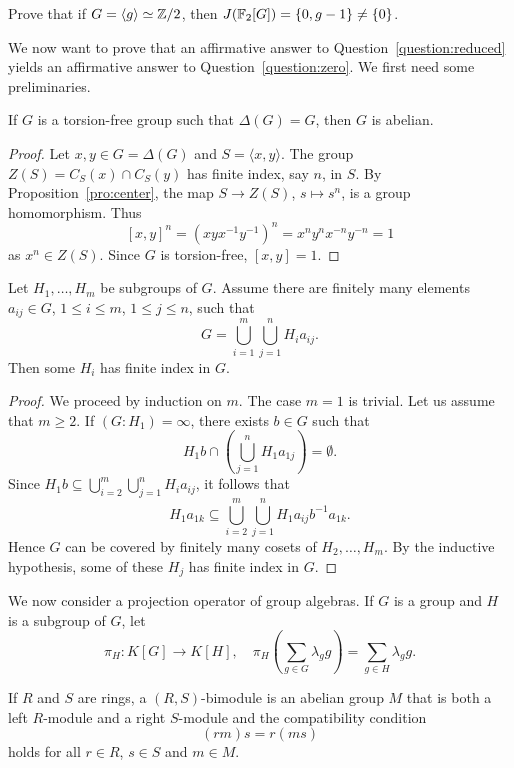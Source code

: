 \begin{exercise}
	Prove that if $G=\langle g\rangle\simeq\mathbb{Z}/2$, then 
	$J(\mathbb{F}_2[G])=\{0,g-1\}\ne\{0\}$. 
\end{exercise}


We now want to prove that an affirmative answer to 
Question~\ref{question:reduced} yields an affirmative answer to Question~\ref{question:zero}. We first need some preliminaries. 

\begin{proposition}
	\label{pro:FCabeliano}
	If $G$ is a torsion-free group such 
	that $\Delta(G)=G$, then $G$ is abelian.
\end{proposition}

\begin{proof}
	Let $x,y\in G=\Delta(G)$ and $S=\langle x,y\rangle$. The group $Z(S)=C_S(x)\cap C_S(y)$ has 
	finite index, say $n$, in $S$. By Proposition~\ref{pro:center}, 
	the map $S\to Z(S)$, $s\mapsto s^n$, is a group homomorphism. Thus  
	\[
		[x,y]^n=(xyx^{-1}y^{-1})^n=x^ny^nx^{-n}y^{-n}=1
	\]
	as $x^n\in Z(S)$. Since $G$ is torsion-free, $[x,y]=1$.
\end{proof}

\begin{lemma}[Neumann]
	\label{lem:Neumann}
	Let $H_1,\dots,H_m$ be subgroups of $G$. 
	Assume there are finitely many elements
	$a_{ij}\in G$, $1\leq i\leq m$, $1\leq j\leq n$, such that 
	\[
		G=\bigcup_{i=1}^m\bigcup_{j=1}^n H_ia_{ij}.
	\]
	Then some $H_i$ has finite index in $G$.
\end{lemma}

\begin{proof}
	We proceed by induction on $m$. The case $m=1$ is trivial. 
	Let us assume that $m\geq2$. If $(G:H_1)=\infty$, there exists $b\in G$
	such that 
	\[
		H_1b\cap\left(
	\bigcup_{j=1}^nH_1a_{1j}\right)=\emptyset.
	\]
	Since $H_1b\subseteq\bigcup_{i=2}^m\bigcup_{j=1}^n H_ia_{ij}$, 
	it follows that 
	\[
		H_1a_{1k}\subseteq \bigcup_{i=2}^m\bigcup_{j=1}^n H_1a_{ij}b^{-1}a_{1k}.
	\]
	Hence $G$ can be covered by finitely many cosets of $H_2,\dots,H_m$. By the inductive hypothesis, 
	some of these $H_j$ has finite index in $G$.
\end{proof}

We now consider a projection operator of group algebras. If $G$ 
is a group and $H$ is a subgroup of $G$, let 
\[
	\pi_H\colon K[G]\to K[H],\quad
	\pi_H\left(\sum_{g\in G}\lambda_gg\right)=\sum_{g\in H}\lambda_gg.
\]

If $R$ and $S$ are rings, a $(R,S)$-bimodule is an abelian group
$M$ that is both a left $R$-module and a right $S$-module 
and the compatibility condition 
\[
(rm)s = r(ms)
\]
holds for all $r\in R$, $s\in S$ and $m\in M$.

